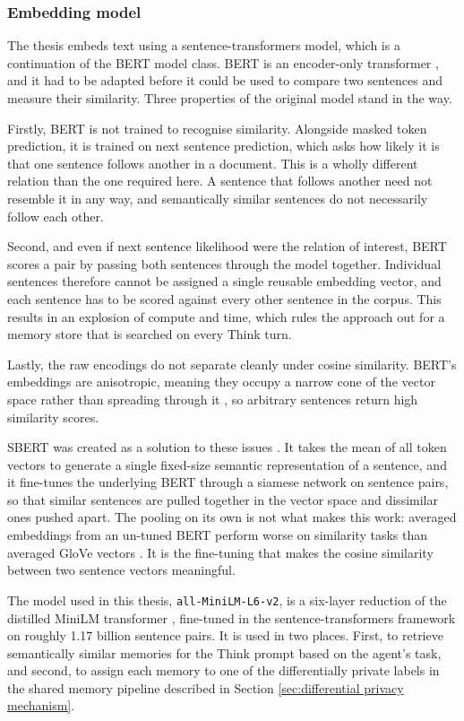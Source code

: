 \subsubsection{Embedding model}\label{sec:embedding-model}
The thesis embeds text using a sentence-transformers model, which is a continuation of the BERT model class. BERT is an encoder-only transformer \citep{devlin2019bert}, and it had to be adapted before it could be used to compare two sentences and measure their similarity. Three properties of the original model stand in the way.

Firstly, BERT is not trained to recognise similarity. Alongside masked token prediction, it is trained on next sentence prediction, which asks how likely it is that one sentence follows another in a document. This is a wholly different relation than the one required here. A sentence that follows another need not resemble it in any way, and semantically similar sentences do not necessarily follow each other.

Second, and even if next sentence likelihood were the relation of interest, BERT scores a pair by passing both sentences through the model together. Individual sentences therefore cannot be assigned a single reusable embedding vector, and each sentence has to be scored against every other sentence in the corpus. This results in an explosion of compute and time, which rules the approach out for a memory store that is searched on every Think turn.

Lastly, the raw encodings do not separate cleanly under cosine similarity. BERT's embeddings are anisotropic, meaning they occupy a narrow cone of the vector space rather than spreading through it \citep{ethayarajh2019contextual}, so arbitrary sentences return high similarity scores.

SBERT was created as a solution to these issues \citep{reimers2019sentencebert}. It takes the mean of all token vectors to generate a single fixed-size semantic representation of a sentence, and it fine-tunes the underlying BERT through a siamese network on sentence pairs, so that similar sentences are pulled together in the vector space and dissimilar ones pushed apart. The pooling on its own is not what makes this work: averaged embeddings from an un-tuned BERT perform worse on similarity tasks than averaged GloVe vectors \citep{reimers2019sentencebert}. It is the fine-tuning that makes the cosine similarity between two sentence vectors meaningful.

The model used in this thesis, \texttt{all-MiniLM-L6-v2}, is a six-layer reduction of the distilled MiniLM transformer \citep{wang2020minilm}, fine-tuned in the sentence-transformers framework on roughly 1.17 billion sentence pairs. It is used in two places. First, to retrieve semantically similar memories for the Think prompt based on the agent's task, and second, to assign each memory to one of the differentially private labels in the shared memory pipeline described in Section \ref{sec:differential privacy mechanism}.

